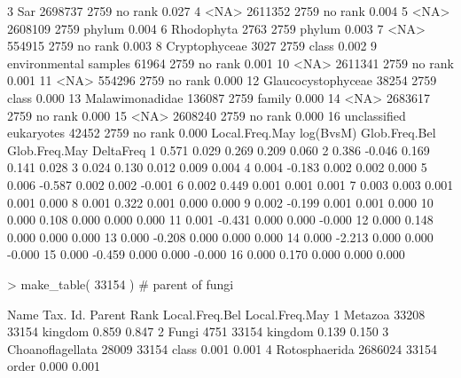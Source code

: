 \documentclass{article}
\begin{document}
\begin{Schunk}
\begin{Soutput}
3                      Sar  2698737   2759 no rank          0.027
4                     <NA>  2611352   2759 no rank          0.004
5                     <NA>  2608109   2759  phylum          0.004
6               Rhodophyta     2763   2759  phylum          0.003
7                     <NA>   554915   2759 no rank          0.003
8            Cryptophyceae     3027   2759   class          0.002
9    environmental samples    61964   2759 no rank          0.001
10                    <NA>  2611341   2759 no rank          0.001
11                    <NA>   554296   2759 no rank          0.000
12      Glaucocystophyceae    38254   2759   class          0.000
13         Malawimonadidae   136087   2759  family          0.000
14                    <NA>  2683617   2759 no rank          0.000
15                    <NA>  2608240   2759 no rank          0.000
16 unclassified eukaryotes    42452   2759 no rank          0.000
   Local.Freq.May log(BvsM) Glob.Freq.Bel Glob.Freq.May DeltaFreq
1           0.571     0.029         0.269         0.209     0.060
2           0.386    -0.046         0.169         0.141     0.028
3           0.024     0.130         0.012         0.009     0.004
4           0.004    -0.183         0.002         0.002     0.000
5           0.006    -0.587         0.002         0.002    -0.001
6           0.002     0.449         0.001         0.001     0.001
7           0.003     0.003         0.001         0.001     0.000
8           0.001     0.322         0.001         0.000     0.000
9           0.002    -0.199         0.001         0.001     0.000
10          0.000     0.108         0.000         0.000     0.000
11          0.001    -0.431         0.000         0.000    -0.000
12          0.000     0.148         0.000         0.000     0.000
13          0.000    -0.208         0.000         0.000     0.000
14          0.000    -2.213         0.000         0.000    -0.000
15          0.000    -0.459         0.000         0.000    -0.000
16          0.000     0.170         0.000         0.000     0.000
\end{Soutput}
\begin{Sinput}
> make_table( 33154 ) # parent of fungi
\end{Sinput}
\begin{Soutput}
              Name Tax. Id. Parent    Rank Local.Freq.Bel Local.Freq.May
1          Metazoa    33208  33154 kingdom          0.859          0.847
2            Fungi     4751  33154 kingdom          0.139          0.150
3 Choanoflagellata    28009  33154   class          0.001          0.001
4    Rotosphaerida  2686024  33154   order          0.000          0.001

\end{Soutput}
\end{Schunk}
\end{document}
